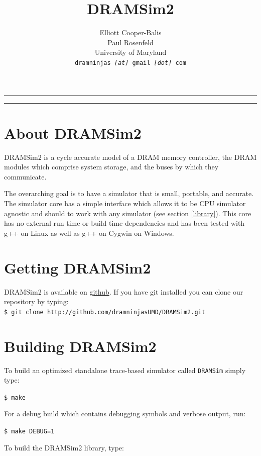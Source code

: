 \documentclass[11pt]{article}
\newcommand{\HRule}{\rule{\linewidth}{0.5mm}}
\begin{document}
\title{DRAMSim2}
\author{Elliott Cooper-Balis \\
			Paul Rosenfeld \\
			University of Maryland \\
			\texttt{\footnotesize dramninjas \textit{[at]} gmail \textit{[dot]} com}
}
\date{}
\maketitle
\HRule
\tableofcontents
\HRule
{}
\section{About DRAMSim2}
	DRAMSim2 is a cycle accurate model of a DRAM memory controller, the DRAM
	modules which comprise system storage, and the buses by which they
	communicate. 

	The overarching goal is to have a simulator that is small,
	portable, and accurate. The simulator core has a simple interface 
	which allows it to be CPU simulator agnostic and should to work with any simulator (see section \ref{library}).  This core has no external run
	time or build time dependencies and has been tested with g++ on Linux
	as well as g++ on Cygwin on Windows.  

\section{Getting DRAMSim2}

DRAMSim2 is available on \href{http://github.com/dramninjasUMD}{github}. If you have git installed you can clone our repository by typing:\\

\texttt{\$ git clone http://github.com/dramninjasUMD/DRAMSim2.git }



\section{Building DRAMSim2}
	To build an optimized standalone trace-based simulator called \texttt{DRAMSim} simply type:

	\texttt{\$ make}

	For a debug build which contains debugging symbols and verbose output, run:

	\texttt{\$ make DEBUG=1}

	To build the DRAMSim2 library, type: 
\end{document}
